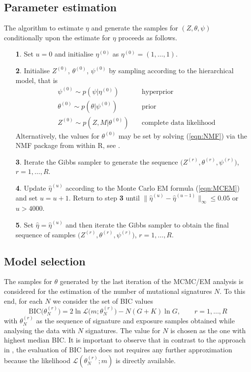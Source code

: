 \documentclass{bioinfo}
\begin{document}
\subsection{Parameter estimation}
The algorithm to estimate $\eta$ and generate the samples for $(Z,
\theta, \psi)$ conditionally upon the estimate for $\eta$ proceeds as 
follows. 
\begin{enumerate}
\item[\textbf{1}.] Set $u = 0$ and initialise $\eta^{(0)}$ as
  $\eta^{(0)} = (1, \ldots, 1)$.
\item[\textbf{2}.] Initialise $Z^{(0)}$, $\theta^{(0)}$, $\psi^{(0)}$
  by sampling according to the hierarchical model, that is
  \begin{align*}
     &\psi^{(0)} \sim p(\psi | \eta^{(0)}) &\ 
        &\text{hyperprior}\\ 
     &\theta^{(0)} \sim p(\theta | \psi^{(0)}) &\ 
        &\text{prior}\\
     &Z^{(0)} \sim p(Z, M|\theta^{(0)}) &\ 
        &\text{complete data likelihood}
  \end{align*}
  Alternatively, the values for $\theta^{(0)}$ may be set by solving 
  (\ref{eqn:NMF}) via the NMF package from within R, see
  \citealp{GS}.
\item[\textbf{3}.] Iterate the Gibbs sampler to generate the sequence
 $\big(Z^{(r)}, \theta^{(r)}, \psi^{(r)}\big)$, $r = 1, \ldots, R$.
\item[\textbf{4}.] Update $\hat\eta^{(u)}$ according to the Monte
  Carlo EM formula (\ref{eqn:MCEM}) and set $u = u+1$. Return to step
\textbf{3} until $\big\|\hat\eta^{(u)} - \hat\eta^{(u-1)}\big\|_\infty  
\leqslant 0.05$ or $u > 4000$. 
\item[\textbf{5}.] Set $\hat\eta = \hat\eta^{(u)}$ and then iterate
  the Gibbs sampler to obtain the final sequence of samples
  $\big(Z^{(r)}, \theta^{(r)}, \psi^{(r)}\big)$, $r=1, \ldots,
  R$. 
\end{enumerate}

\subsection{Model selection}
The samples for $\theta$ generated by the last iteration of the
MCMC/EM analysis is considered for the estimation of the number 
of mutational signatures $N$. To this end, for each $N$ we consider
the set of BIC values
\[
  \text{BIC}\big(\theta^{(r)}_N\big) = 2\ln\mathcal L\big(m;
    \theta^{(r)}_{N}\big) - N(G+K)\ln G, \qquad r =1, \ldots,
    R
\]
with $\theta^{(r)}_N$ as the sequence of signature and exposure 
samples obtained while analysing the  data with $N$
signatures. The value for $N$ is chosen as the one with highest median 
BIC. It is important to observe that in contrast to the approach in
\cite{FICMV}, the evaluation of BIC here does not requires any further
approximation because the likelihood $\mathcal L(\theta^{(r)}_N; m)$
is directly available.
\end{document}
